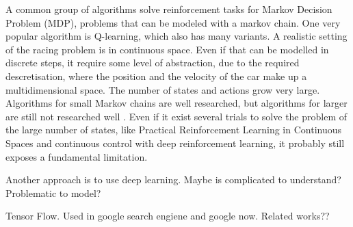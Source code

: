 A common group of algorithms solve reinforcement tasks for Markov Decision Problem (MDP), problems that can be modeled with a markov chain. One very popular algorithm is Q-learning, which also has many variants. A realistic setting of the racing problem is in continuous space. Even if that can be modelled in discrete steps, it require some level of abstraction, due to the required descretisation, where the position and the velocity of the car make up a multidimensional space. The number of states and actions grow very large\cite{}. Algorithms for small Markov chains are well researched, but algorithms for larger are still not researched well \cite{}. Even if it exist several trials to solve the problem of the large number of states, like Practical Reinforcement Learning in Continuous Spaces and continuous control with deep reinforcement learning, it probably still exposes a fundamental limitation.

Another approach is to use deep learning. Maybe is complicated to understand? Problematic to model?

Tensor Flow. Used in google search engiene and google now. Related works??



